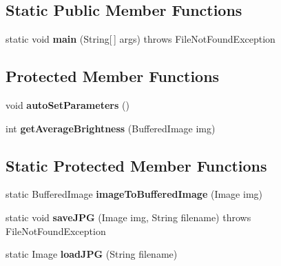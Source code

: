 \subsection*{Static Public Member Functions}
\begin{DoxyCompactItemize}
\item 
\hypertarget{classcom_1_1zeuslearning_1_1automation_1_1unittests_1_1ImageCompare_a9e6559ca754d9f30c76fb9c9678d728f}{}\label{classcom_1_1zeuslearning_1_1automation_1_1unittests_1_1ImageCompare_a9e6559ca754d9f30c76fb9c9678d728f} 
static void {\bfseries main} (String\mbox{[}$\,$\mbox{]} args)  throws File\+Not\+Found\+Exception 
\end{DoxyCompactItemize}
\subsection*{Protected Member Functions}
\begin{DoxyCompactItemize}
\item 
\hypertarget{classcom_1_1zeuslearning_1_1automation_1_1unittests_1_1ImageCompare_a723318ef42f6ef47b7628169f7002a15}{}\label{classcom_1_1zeuslearning_1_1automation_1_1unittests_1_1ImageCompare_a723318ef42f6ef47b7628169f7002a15} 
void {\bfseries auto\+Set\+Parameters} ()
\item 
\hypertarget{classcom_1_1zeuslearning_1_1automation_1_1unittests_1_1ImageCompare_ad6ca347f2005e8ce0142380fbdc23924}{}\label{classcom_1_1zeuslearning_1_1automation_1_1unittests_1_1ImageCompare_ad6ca347f2005e8ce0142380fbdc23924} 
int {\bfseries get\+Average\+Brightness} (Buffered\+Image img)
\end{DoxyCompactItemize}
\subsection*{Static Protected Member Functions}
\begin{DoxyCompactItemize}
\item 
\hypertarget{classcom_1_1zeuslearning_1_1automation_1_1unittests_1_1ImageCompare_a85336c135a4539e7b95a76be6065aefb}{}\label{classcom_1_1zeuslearning_1_1automation_1_1unittests_1_1ImageCompare_a85336c135a4539e7b95a76be6065aefb} 
static Buffered\+Image {\bfseries image\+To\+Buffered\+Image} (Image img)
\item 
\hypertarget{classcom_1_1zeuslearning_1_1automation_1_1unittests_1_1ImageCompare_adacb06f28c675a76743db84524bd2bcb}{}\label{classcom_1_1zeuslearning_1_1automation_1_1unittests_1_1ImageCompare_adacb06f28c675a76743db84524bd2bcb} 
static void {\bfseries save\+J\+PG} (Image img, String filename)  throws File\+Not\+Found\+Exception 
\item 
\hypertarget{classcom_1_1zeuslearning_1_1automation_1_1unittests_1_1ImageCompare_a7f97502ab1eb4721624f78a9ef1752c0}{}\label{classcom_1_1zeuslearning_1_1automation_1_1unittests_1_1ImageCompare_a7f97502ab1eb4721624f78a9ef1752c0} 
static Image {\bfseries load\+J\+PG} (String filename)
\end{DoxyCompactItemize}
